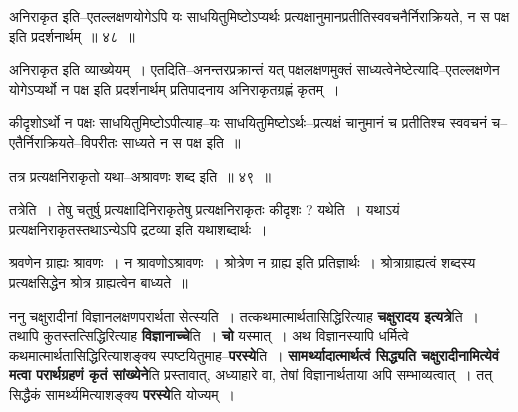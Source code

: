 \documentclass[article,12pt,a4paper]{memoir}
\begin{document}
	  \pstart अनिराकृत इति--एतल्लक्षणयोगेऽपि यः साधयितुमिष्टोऽप्यर्थः प्रत्यक्षानुमानप्रतीतिस्ववचनैर्निराक्रियते, न स पक्ष इति प्रदर्शनार्थम् ॥ ४८ ॥
	\pend
      
	  \endgroup
	
	  \bigskip
	  \begingroup
	

	  \pstart अनिराकृत इति व्याख्येयम् । एतदिति--अनन्तरप्रक्रान्तं यत् पक्षलक्षणमुक्तं साध्यत्वेनेष्टेत्यादि--एतल्लक्षणेन योगेऽप्यर्थो न पक्ष इति प्रदर्शनार्थम् प्रतिपादनाय अनिराकृतग्रह्णं कृतम् ।
	\pend
        

	  \pstart कीदृशोऽर्थो न पक्षः साधयितुमिष्टोऽपीत्याह--यः साधयितुमिष्टोऽर्थः--प्रत्यक्षं चानुमानं च प्रतीतिश्च स्ववचनं च--एतैर्निराक्रियते--विपरीतः साध्यते न स पक्ष इति ॥
	\pend
        
	  \bigskip
	  \begingroup
	

	  \pstart तत्र प्रत्यक्षनिराकृतो यथा--अश्रावणः शब्द इति ॥ ४९ ॥
	\pend
      
	  \endgroup
	 

	  \pstart तत्रेति । तेषु चतुर्षु प्रत्यक्षादिनिराकृतेषु प्रत्यक्षनिराकृतः कीदृशः ? यथेति । यथाऽयं प्रत्यक्षनिराकृतस्तथाऽन्येऽपि द्रटव्या इति यथाशब्दार्थः ।
	\pend
        

	  \pstart श्रवणेन ग्राह्यः श्रावणः । न श्रावणोऽश्रावणः । श्रोत्रेण न ग्राह्य इति प्रतिज्ञार्थः । श्रोत्राग्राह्यत्वं शब्दस्य प्रत्यक्षसिद्धेन श्रोत्र ग्राह्यत्वेन बाध्यते ॥
	\pend
      
	  \endgroup
	

	  \pstart ननु चक्षुरादीनां विज्ञानलक्षणपरार्थता सेत्स्यति । तत्कथमात्मार्थतासिद्धिरित्याह \textbf{चक्षुरादय इत्यत्रे}ति । तथापि कुतस्तत्सिद्धिरित्याह \textbf{विज्ञानाच्चे}ति । \textbf{चो} यस्मात् । अथ विज्ञानस्यापि धर्मित्वे कथमात्मार्थतासिद्धिरित्याशङ्क्य स्पष्टयितुमाह--\textbf{परस्ये}ति । \textbf{सामर्थ्यादात्मार्थत्वं सिद्ध्यति चक्षुरादीनामित्येवं मत्वा परार्थग्रहणं कृतं सांख्येने}ति प्रस्तावात्, अध्याहारे वा, तेषां विज्ञानार्थताया अपि सम्भाव्यत्वात् । तत् सिद्धैकं सामर्थ्यमित्याशङ्क्य \textbf{परस्ये}ति योज्यम् ।
	\pend
      
\end{document}
